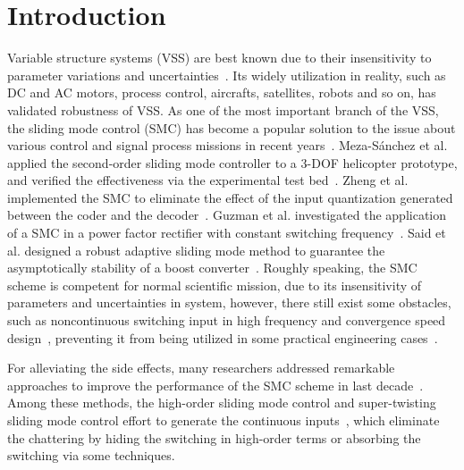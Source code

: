 \documentclass[3p]{elsarticle}
\theoremstyle{plain}
\theoremstyle{remark}
\begin{document}
\section{Introduction}
Variable structure systems (VSS) are best known due to their insensitivity to parameter variations and uncertainties~\cite{slotine1991applied}. Its widely utilization in reality, such as DC and AC motors, process control, aircrafts, satellites, robots and so on, has validated robustness of VSS. As one of the most important branch of the VSS, the sliding mode control (SMC) has become a popular solution to the issue about various control and signal process missions in recent years~\cite{zhao2015nonlinear,zhang2015attitude}. Meza-S{\'a}nchez et al. applied the second-order sliding mode controller to a 3-DOF helicopter prototype, and verified the effectiveness via the experimental test bed~\cite{meza2015output}. Zheng et al. implemented the SMC to eliminate the effect of the input quantization generated between the coder and the decoder~\cite{zheng2016sliding}. Guzman et al. investigated the application of a SMC in a power factor rectifier with constant switching frequency~\cite{guzman2016sliding}. Said et al. designed a robust adaptive sliding mode method to guarantee the asymptotically stability of a boost converter~\cite{oucheriah2013pwm}. Roughly speaking, the SMC scheme is competent for normal scientific mission, due to its insensitivity of parameters and uncertainties in system, however, there still exist some obstacles, such as noncontinuous switching input in high frequency and convergence speed design~\cite{boiko2013chattering,lee2009chattering}, preventing it from being utilized in some practical engineering cases~\cite{fridman2011sliding}. \par
For alleviating the side effects, many researchers addressed remarkable approaches to improve the performance of the SMC scheme in last decade~\cite{zong2013quasi,santiesteban2013time,mu2015continuous,evangelista2013lyapunov,gonzalez2014chattering,dadras2012fractional,zhao2013output}. Among these methods, the high-order sliding mode control and super-twisting sliding mode control effort to generate the continuous inputs~\cite{castillo2015higher,palosz2015laser,edwards2016adaptive,zhao2015finite,liu2015second}, which eliminate the chattering by hiding the switching in high-order terms or absorbing the switching via some techniques. \par
\end{document}
